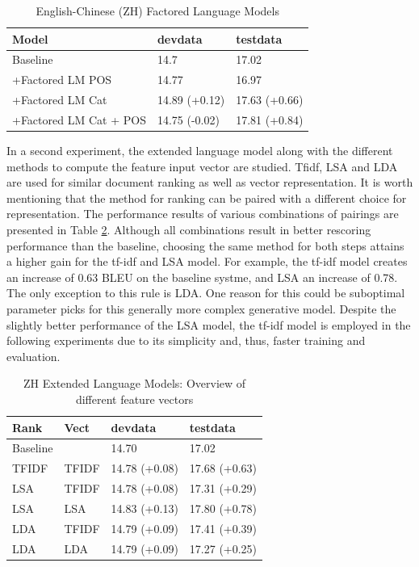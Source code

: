 \documentclass[a4paper]{article}
\begin{document}
\begin{table}
\caption{English-Chinese (ZH) Factored Language Models}
\centering
  \begin{tabular}{ lll }
  	\hline
  	Model                  & devdata       & testdata      \\ \hline\hline
  	Baseline               & 14.7          & 17.02         \\
  	+Factored LM POS       & 14.77         & 16.97         \\ \hline
  	+Factored LM Cat       & 14.89 (+0.12) & 17.63 (+0.66) \\
  	+Factored LM Cat + POS & 14.75 (-0.02) & 17.81 (+0.84) \\ \hline
  \end{tabular}
  \label{tb:zh-factored}
\end{table}

In a second experiment, the extended language model along with the different methods to compute the feature input vector are studied. Tfidf, LSA and LDA are used for similar document ranking as well as vector representation. It is worth mentioning that the method for ranking can be paired with a different choice for representation. The performance results of various combinations of pairings are presented in Table \ref{tb:zh-extended-diff-features}. Although all combinations result in better rescoring performance than the baseline, choosing the same method for both steps attains a higher gain for the tf-idf and LSA model. For example, the tf-idf model creates an increase of 0.63 BLEU on the baseline systme, and LSA an increase of 0.78. The only exception to this rule is LDA. One reason for this could be suboptimal parameter picks for this generally more complex generative model. Despite the slightly better performance of the LSA model, the tf-idf model is employed in the following experiments due to its simplicity and, thus, faster training and evaluation.

\begin{table}
\caption{ZH Extended Language Models: Overview of different feature vectors}
\centering
  \begin{tabular}{llll}
  	\hline
  	Rank     & Vect  & devdata       & testdata      \\ \hline\hline
  	Baseline &       & 14.70         & 17.02         \\ \hline
  	TFIDF    & TFIDF & 14.78 (+0.08) & 17.68 (+0.63) \\
  	LSA      & TFIDF & 14.78 (+0.08) & 17.31 (+0.29) \\
  	LSA      & LSA   & 14.83 (+0.13) & 17.80 (+0.78) \\
  	LDA      & TFIDF & 14.79 (+0.09) & 17.41 (+0.39) \\
  	LDA      & LDA   & 14.79 (+0.09) & 17.27 (+0.25)
  \end{tabular}
  \label{tb:zh-extended-diff-features}
\end{table}
\end{document}
